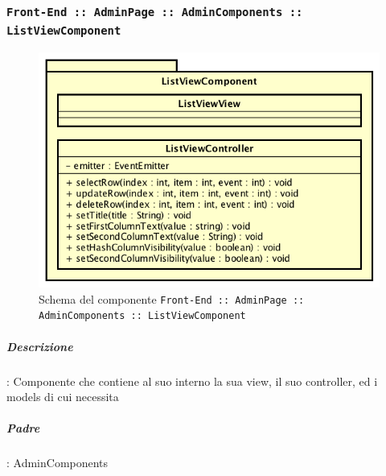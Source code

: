 \documentclass[../DefinizioneDiProdotto_v2.0.0.tex]{subfiles}
\begin{document}
	\subsubsection{\texttt{Front-End :: AdminPage :: AdminComponents :: ListViewComponent}}
	\begin{figure}[!h]
		\centering
		\includegraphics[scale=0.6]{Architettura/Front-End/AdminPage/AdminComponents/ListViewComponent.png}
		\caption{Schema del componente \texttt{Front-End :: AdminPage :: AdminComponents :: ListViewComponent}}
	\end{figure}

			\subparagraph{Descrizione}: Componente che contiene al suo interno la sua view, il suo controller, ed i models di cui necessita
			\subparagraph{Padre}: AdminComponents
\end{document}

